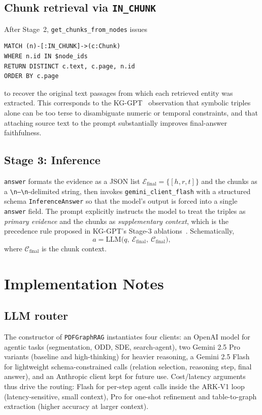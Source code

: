 \documentclass[11pt,a4paper]{article}
\begin{document}
\subsection{Chunk retrieval via \texttt{IN\_CHUNK}}

After Stage~2, \texttt{get\_chunks\_from\_nodes} issues
\begin{verbatim}
MATCH (n)-[:IN_CHUNK]->(c:Chunk)
WHERE n.id IN $node_ids
RETURN DISTINCT c.text, c.page, n.id
ORDER BY c.page
\end{verbatim}
to recover the original text passages from which each retrieved entity was
extracted. This corresponds to the KG-GPT~\cite{kggpt2023} observation that
symbolic triples alone can be too terse to disambiguate numeric or temporal
constraints, and that attaching source text to the prompt substantially
improves final-answer faithfulness.

\subsection{Stage 3: Inference}

\texttt{answer} formats the evidence as a JSON list
$\mathcal{E}_{\text{final}}=\{[h,r,t]\}$ and the chunks as a
\texttt{\textbackslash n---\textbackslash n}-delimited string, then invokes
\texttt{gemini\_client\_flash} with a structured schema
\texttt{InferenceAnswer} so that the model's output is forced into a single
\texttt{answer} field. The prompt explicitly instructs the model to treat the
triples as \emph{primary evidence} and the chunks as \emph{supplementary
context}, which is the precedence rule proposed in KG-GPT's Stage-3
ablations~\cite{kggpt2023}. Schematically,
\[
a=\text{LLM}\big(q,\ \mathcal{E}_{\text{final}},\ \mathcal{C}_{\text{final}}\big),
\]
where $\mathcal{C}_{\text{final}}$ is the chunk context.

\section{Implementation Notes}
\label{sec:impl}

\subsection{LLM router}

The constructor of \texttt{PDFGraphRAG} instantiates four clients: an OpenAI
model for agentic tasks (segmentation, ODD, SDE, search-agent), two Gemini
2.5 Pro variants (baseline and high-thinking) for heavier reasoning, a
Gemini 2.5 Flash for lightweight schema-constrained calls
(relation selection, reasoning step, final answer), and an Anthropic client
kept for future use. Cost/latency arguments thus drive the routing: Flash for
per-step agent calls inside the ARK-V1 loop (latency-sensitive, small
context), Pro for one-shot refinement and table-to-graph extraction (higher
accuracy at larger context).
\end{document}
